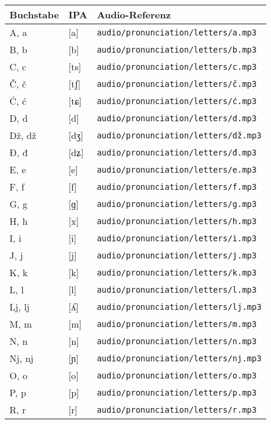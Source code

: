 \begin{center}
\begin{tabular}{lll}
\toprule
\textbf{Buchstabe} & \textbf{IPA} & \textbf{Audio-Referenz} \\
\midrule
A, a & [a] & \small\texttt{audio/pronunciation/letters/a.mp3} \\
B, b & [b] & \small\texttt{audio/pronunciation/letters/b.mp3} \\
C, c & [ts] & \small\texttt{audio/pronunciation/letters/c.mp3} \\
Č, č & [tʃ] & \small\texttt{audio/pronunciation/letters/č.mp3} \\
Ć, ć & [tɕ] & \small\texttt{audio/pronunciation/letters/ć.mp3} \\
D, d & [d] & \small\texttt{audio/pronunciation/letters/d.mp3} \\
Dž, dž & [dʒ] & \small\texttt{audio/pronunciation/letters/dž.mp3} \\
Đ, đ & [dʑ] & \small\texttt{audio/pronunciation/letters/đ.mp3} \\
E, e & [e] & \small\texttt{audio/pronunciation/letters/e.mp3} \\
F, f & [f] & \small\texttt{audio/pronunciation/letters/f.mp3} \\
G, g & [ɡ] & \small\texttt{audio/pronunciation/letters/g.mp3} \\
H, h & [x] & \small\texttt{audio/pronunciation/letters/h.mp3} \\
I, i & [i] & \small\texttt{audio/pronunciation/letters/i.mp3} \\
J, j & [j] & \small\texttt{audio/pronunciation/letters/j.mp3} \\
K, k & [k] & \small\texttt{audio/pronunciation/letters/k.mp3} \\
L, l & [l] & \small\texttt{audio/pronunciation/letters/l.mp3} \\
Lj, lj & [ʎ] & \small\texttt{audio/pronunciation/letters/lj.mp3} \\
M, m & [m] & \small\texttt{audio/pronunciation/letters/m.mp3} \\
N, n & [n] & \small\texttt{audio/pronunciation/letters/n.mp3} \\
Nj, nj & [ɲ] & \small\texttt{audio/pronunciation/letters/nj.mp3} \\
O, o & [o] & \small\texttt{audio/pronunciation/letters/o.mp3} \\
P, p & [p] & \small\texttt{audio/pronunciation/letters/p.mp3} \\
R, r & [r] & \small\texttt{audio/pronunciation/letters/r.mp3} \\

\end{tabular}
\end{center}
